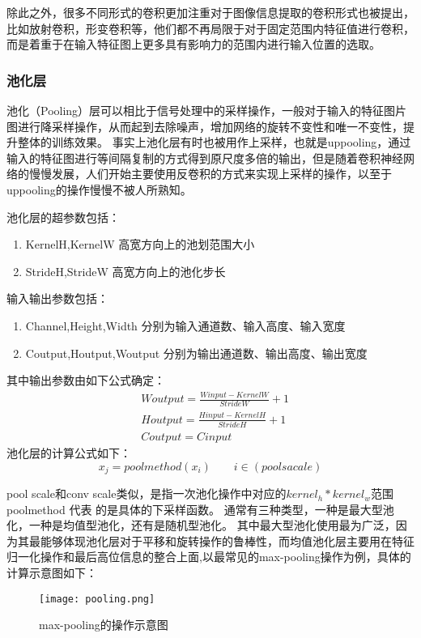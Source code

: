 除此之外，很多不同形式的卷积更加注重对于图像信息提取的卷积形式也被提出，比如放射卷积，形变卷积等，他们都不再局限于对于固定范围内特征值进行卷积，而是着重于在输入特征图上更多具有影响力的范围内进行输入位置的选取。

\subsubsection{池化层}
池化（Pooling）层可以相比于信号处理中的采样操作，一般对于输入的特征图片图进行降采样操作，从而起到去除噪声，增加网络的旋转不变性和唯一不变性，提升整体的训练效果。
事实上池化层有时也被用作上采样，也就是uppooling，通过输入的特征图进行等间隔复制的方式得到原尺度多倍的输出，但是随着卷积神经网络的慢慢发展，人们开始主要使用反卷积的方式来实现上采样的操作，以至于uppooling的操作慢慢不被人所熟知。

池化层的超参数包括：
\begin{enumerate}
\item KernelH,KernelW 高宽方向上的池划范围大小 
\item StrideH,StrideW 高宽方向上的池化步长
\end{enumerate}
输入输出参数包括：
\begin{enumerate}
\item Channel,Height,Width 分别为输入通道数、输入高度、输入宽度
\item  Coutput,Houtput,Woutput 分别为输出通道数、输出高度、输出宽度
\end{enumerate}
其中输出参数由如下公式确定：
\begin{equation}{
\begin{split}
 & Woutput= \frac{Winput-KernelW}{StrideW} +1 \\
 & Houtput= \frac{Hinput-KernelH}{StrideH} +1 \\
 & Coutput= Cinput
\end{split}
}\end{equation}
池化层的计算公式如下：
\begin{equation}{
x_j=poolmethod(x_i) \qquad  i\in (poolsacale)
}
\end{equation}

pool scale和conv scale类似，是指一次池化操作中对应的$kernel_h*kernel_w$范围
poolmethod 代表 的是具体的下采样函数。
通常有三种类型，一种是最大型池化，一种是均值型池化，还有是随机型池化。
其中最大型池化使用最为广泛，因为其最能够体现池化层对于平移和旋转操作的鲁棒性，而均值池化层主要用在特征归一化操作和最后高位信息的整合上面,以最常见的max-pooling操作为例，具体的计算示意图如下：
\begin{figure}[!ht]
 \centering
	\texttt{[image: pooling.png]}
	\caption{max-pooling的操作示意图}
\end{figure}

